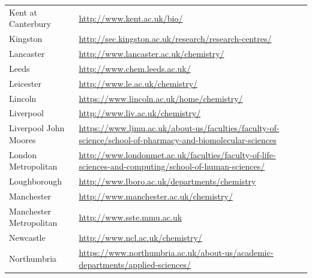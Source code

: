 \begin{table}
\begin{tabular}{||l|l}
 Kent at Canterbury                 & \url{http://www.kent.ac.uk/bio/}                                                                                                           \\
 Kingston                           & \url{http://sec.kingston.ac.uk/research/research-centres/}                                                                                 \\
 Lancaster                          & \url{http://www.lancaster.ac.uk/chemistry/}                                                                                                \\
 Leeds                              & \url{http://www.chem.leeds.ac.uk/}                                                                                                         \\
 Leicester                          & \url{http://www.le.ac.uk/chemistry/}                                                                                                       \\
 Lincoln                            & \url{https://www.lincoln.ac.uk/home/chemistry/}                                                                                            \\
 Liverpool                          & \url{http://www.liv.ac.uk/chemistry/}                                                                                                      \\
 Liverpool John Moores              & \url{https://www.ljmu.ac.uk/about-us/faculties/faculty-of-science/school-of-pharmacy-and-biomolecular-sciences}                            \\
 London Metropolitan                & \url{http://www.londonmet.ac.uk/faculties/faculty-of-life-sciences-and-computing/school-of-human-sciences/}                                \\
 Loughborough                       & \url{http://www.lboro.ac.uk/departments/chemistry}                                                                                         \\
 Manchester                         & \url{http://www.manchester.ac.uk/chemistry/}                                                                                               \\
 Manchester Metropolitan            & \url{http://www.sste.mmu.ac.uk}                                                                                                            \\
 Newcastle                          & \url{http://www.ncl.ac.uk/chemistry/}                                                                                                      \\
 Northumbria                        & \url{https://www.northumbria.ac.uk/about-us/academic-departments/applied-sciences/}                                                        
 \end{tabular}
 

\end{table}

